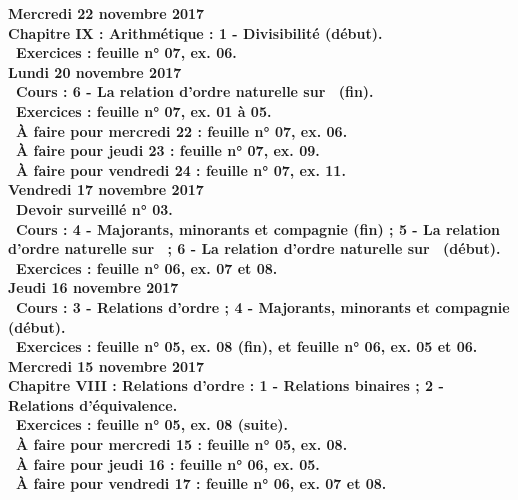 \documentclass[12pt,a4paper]{article}
\begin{document}
\noindent\textbf{\bf Mercredi 22 novembre 2017}\\
\bf Chapitre IX \rm : Arithmétique : 1 - Divisibilité (début).\\
\bu\ Exercices : feuille n° 07, ex. 06.\\

\noindent\textbf{Lundi 20 novembre 2017}\\
 \bu\ Cours : 6 - La relation d'ordre naturelle sur \R\ (fin).\\
\bu\ Exercices : feuille n° 07, ex. 01 à 05.\\
\bu\ À faire pour mercredi 22 : feuille n° 07, ex. 06.\\
\bu\ À faire pour jeudi 23 : feuille n° 07, ex. 09.\\
\bu\ À faire pour vendredi 24 : feuille n° 07, ex. 11.\vspace{.4cm}\\

\noindent\textbf{Vendredi 17 novembre 2017}\\
\bu\ Devoir surveillé n° 03.\\
 \bu\ Cours : 4 - Majorants, minorants et compagnie (fin) ; 5 - La relation d'ordre naturelle sur \N\ ; 
 6 - La relation d'ordre naturelle sur \R\ (début).\\
\bu\ Exercices : feuille n° 06, ex. 07 et 08.\vspace{.4cm}\\

\noindent\textbf{Jeudi 16 novembre 2017}\\
 \bu\ Cours : 3 - Relations d'ordre ;  4 - Majorants, minorants et compagnie (début).\\
\bu\ Exercices : feuille n° 05, ex. 08 (fin), et feuille n° 06, ex. 05 et 06.\vspace{.4cm}\\

\noindent\textbf{\bf Mercredi 15 novembre 2017}\\
\bf Chapitre VIII \rm : Relations d'ordre : 1 - Relations binaires ; 2 - Relations d'équivalence.\\
\bu\ Exercices : feuille n° 05, ex. 08 (suite).\\
\bu\ À faire pour mercredi 15 : feuille n° 05, ex. 08.\\
\bu\ À faire pour jeudi 16 : feuille n° 06, ex. 05.\\
\bu\ À faire pour vendredi 17 : feuille n° 06, ex. 07 et 08.\vspace{.4cm}\\
\end{document}
